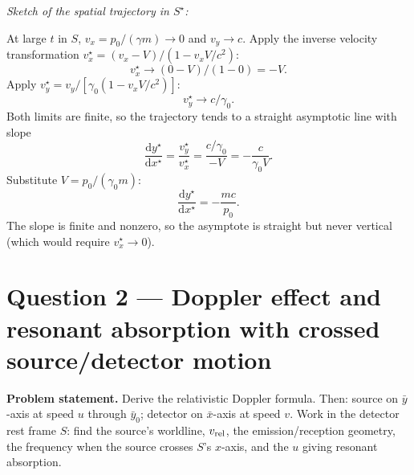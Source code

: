 \documentclass[11pt]{article}
\newcommand{\de}{\mathrm{d}}
\begin{document}
\medskip
\noindent\emph{Sketch of the spatial trajectory in $S^\star$:}
\begin{center}
\end{center}

At large $t$ in $S$, $v_x = p_0/(\gamma m)\to 0$ and $v_y\to c$. Apply the inverse velocity transformation $v_x^\star = (v_x-V)/(1-v_x V/c^2)$:
\[ v_x^\star \to (0-V)/(1-0) = -V. \]
Apply $v_y^\star = v_y/[\gamma_0(1-v_x V/c^2)]$:
\[ v_y^\star \to c/\gamma_0. \]
Both limits are finite, so the trajectory tends to a straight asymptotic line with slope
\[ \frac{\de y^\star}{\de x^\star} = \frac{v_y^\star}{v_x^\star} = \frac{c/\gamma_0}{-V} = -\frac{c}{\gamma_0 V}. \]
Substitute $V = p_0/(\gamma_0 m)$:
\[ \frac{\de y^\star}{\de x^\star} = -\frac{mc}{p_0}. \]
The slope is finite and nonzero, so the asymptote is straight but never vertical (which would require $v_x^\star\to 0$).

\section*{Question 2 --- Doppler effect and resonant absorption with crossed source/detector motion}

\textbf{Problem statement.} Derive the relativistic Doppler formula. Then: source on $\bar y$-axis at speed $u$ through $\bar y_0$; detector on $\bar x$-axis at speed $v$. Work in the detector rest frame $S$: find the source's worldline, $v_{\rm rel}$, the emission/reception geometry, the frequency when the source crosses $S$'s $x$-axis, and the $u$ giving resonant absorption.
\end{document}
